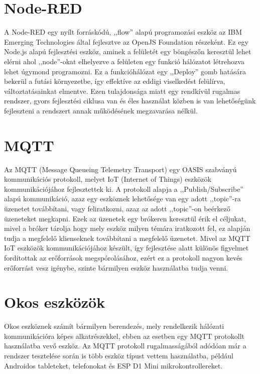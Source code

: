 \documentclass[]{thesis-ekf}
\theoremstyle{definition}
\theoremstyle{remark}
\begin{document}
\section{Node-RED}
A Node-RED egy nyílt forráskódú, ,,flow'' alapú programozási eszköz az IBM Emerging Technologies\cite{ibmET} 
által fejlesztve az OpenJS Foundation\cite{openjs} részeként. Ez egy Node.js alapú fejlesztési eszköz, aminek a felületét egy 
böngészőn keresztül lehet elérni ahol ,,node''-okat elhelyezve a felületen  egy funkció hálózatot létrehozva lehet úgymond programozni. 
Ez a funkcióhálózat egy ,,Deploy'' gomb hatására bekerül a futási környezetbe, így effektíve az eddigi viselkedést felülírva, 
változtatásainkat elmentve. Ezen tulajdonsága miatt egy rendkívül rugalmas rendszer, gyors fejlesztési ciklusa van és éles használat
közben is van lehetőségünk fejleszteni a rendszert annak működésének megzavarása nélkül.

\section{MQTT}
Az MQTT (Message Queueing Telemetry Transport)\cite{mqtt} egy OASIS szabványú kommunikációs protokoll, 
melyet IoT (Internet of Things) eszközök kommunikációjához fejlesztettek ki. 
A protokoll alapja a ,,Publish/Subscribe'' alapú kommunikáció, azaz egy eszköznek lehetősége van egy adott ,,topic''-ra üzenetet továbbítani, 
vagy feliratkozni, azaz az adott ,,topic''-on beérkező üzeneteket megkapni. Ezek az üzenetek egy brókeren keresztül érik el céljukat, 
mivel a bróker tárolja hogy mely eszköz milyen témára iratkozott fel, ez alapján tudja a megfelelő klienseknek továbbítani a megfelelő üzenetet. 
Mivel az MQTT IoT eszközök kommunikációjához készült, így fejlesztése alatt különös figyelmet fordítottak az erőforrások megspórolásához, 
ezért ez a protokoll nagyon kevés erőforrást vesz igénybe, szinte bármilyen eszköz használatba tudja venni.

\section{Okos eszközök}
Okos eszköznek számít bármilyen berendezés, mely rendelkezik hálózati kommunikációra képes alkatrészekkel, 
ebben az esetben egy MQTT protokollt használatba vevő eszköz. Az MQTT protokoll rugalmasságából 
adódóan már a rendszer tesztelése során is több eszköz típust 
vettem használatba, például Androidos tableteket, telefonokat és ESP D1 Mini mikrokontrollereket.
\end{document}
